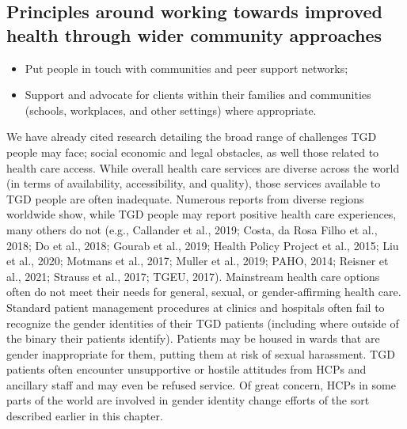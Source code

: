 \documentclass[
]{book}
\providecommand{\tightlist}{%
  \setlength{\itemsep}{0pt}\setlength{\parskip}{0pt}}
\begin{document}
\hypertarget{principles-around-working-towards-improved-health-through-wider-community-approaches}{%
\subsection*{Principles around working towards improved health through wider community approaches}\label{principles-around-working-towards-improved-health-through-wider-community-approaches}}

\begin{itemize}
\tightlist
\item
  Put people in touch with communities and
  peer support networks;
\item
  Support and advocate for clients within
  their families and communities (schools,
  workplaces, and other settings) where
  appropriate.
\end{itemize}

We have already cited research detailing the broad
range of challenges TGD people may face; social
economic and legal obstacles, as well those related
to health care access. While overall health care services are diverse across the world (in terms of availability, accessibility, and quality), those services
available to TGD people are often inadequate.
Numerous reports from diverse regions worldwide
show, while TGD people may report positive health
care experiences, many others do not (e.g., Callander
et al., 2019; Costa, da Rosa Filho et al., 2018; Do
et al., 2018; Gourab et al., 2019; Health Policy
Project et al., 2015; Liu et al., 2020; Motmans et al.,
2017; Muller et al., 2019; PAHO, 2014; Reisner et al.,
2021; Strauss et al., 2017; TGEU, 2017). Mainstream
health care options often do not meet their needs
for general, sexual, or gender-affirming health care.
Standard patient management procedures at clinics
and hospitals often fail to recognize the gender identities of their TGD patients (including where outside
of the binary their patients identify). Patients may
be housed in wards that are gender inappropriate
for them, putting them at risk of sexual harassment.
TGD patients often encounter unsupportive or hostile attitudes from HCPs and ancillary staff and may
even be refused service. Of great concern, HCPs in
some parts of the world are involved in gender identity change efforts of the sort described earlier in
this chapter.
\end{document}

